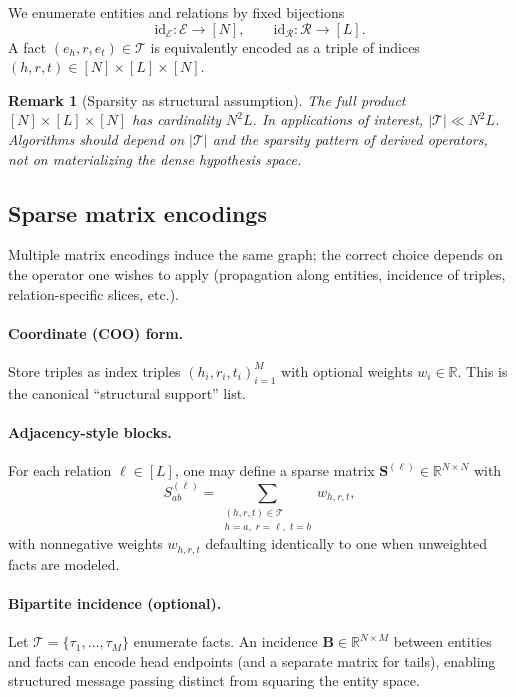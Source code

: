 \documentclass[11pt]{article}
\newtheorem{remark}{Remark}
\begin{document}
We enumerate entities and relations by fixed bijections
\[
  \mathrm{id}_{\mathcal{E}} : \mathcal{E} \to [N], \qquad
  \mathrm{id}_{\mathcal{R}} : \mathcal{R} \to [L].
\]
A fact $(e_h, r, e_t) \in \mathcal{T}$ is equivalently encoded as a triple of indices $(h,r,t) \in [N] \times [L] \times [N]$.

\begin{remark}[Sparsity as structural assumption]
The full product $[N] \times [L] \times [N]$ has cardinality $N^2 L$.
In applications of interest, $|\mathcal{T}| \ll N^2 L$.
Algorithms should depend on $|\mathcal{T}|$ and the sparsity pattern of derived operators, not on materializing the dense hypothesis space.
\end{remark}

\subsection{Sparse matrix encodings}
Multiple matrix encodings induce the same graph; the correct choice depends on the operator one wishes to apply (propagation along entities, incidence of triples, relation-specific slices, etc.).

\paragraph{Coordinate (COO) form.}
Store triples as index triples $(h_i, r_i, t_i)_{i=1}^{M}$ with optional weights $w_i \in \mathbb{R}$.
This is the canonical ``structural support'' list.

\paragraph{Adjacency-style blocks.}
For each relation $\ell \in [L]$, one may define a sparse matrix $\bm{S}^{(\ell)} \in \mathbb{R}^{N \times N}$ with
\begin{equation}
  \label{eq:rel-adjacency}
  S^{(\ell)}_{ab} = \sum_{\substack{(h,r,t)\in \mathcal{T}\\ h=a,\; r=\ell,\; t=b}} w_{h,r,t},
\end{equation}
with nonnegative weights $w_{h,r,t}$ defaulting identically to one when unweighted facts are modeled.

\paragraph{Bipartite incidence (optional).}
Let $\mathcal{T} = \{ \tau_1,\ldots,\tau_M\}$ enumerate facts.
An incidence $\bm{B} \in \mathbb{R}^{N \times M}$ between entities and facts can encode head endpoints (and a separate matrix for tails), enabling structured message passing distinct from squaring the entity space.
\end{document}
